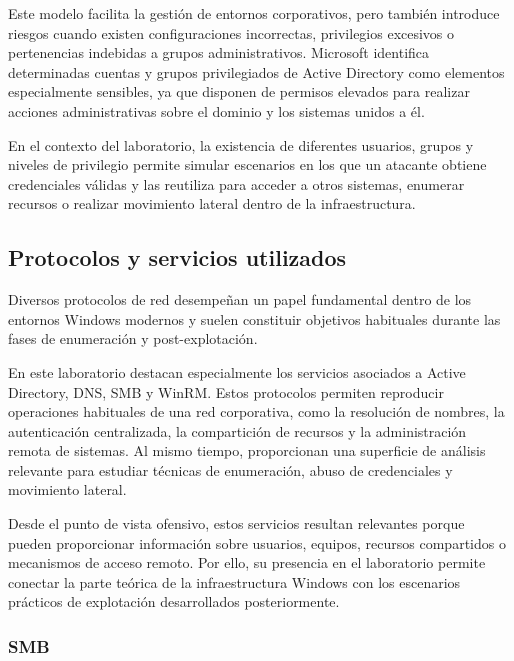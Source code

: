 Este modelo facilita la gestión de entornos corporativos, pero también introduce riesgos cuando existen configuraciones incorrectas, privilegios excesivos o pertenencias indebidas a grupos administrativos. Microsoft identifica determinadas cuentas y grupos privilegiados de Active Directory como elementos especialmente sensibles, ya que disponen de permisos elevados para realizar acciones administrativas sobre el dominio y los sistemas unidos a él.

En el contexto del laboratorio, la existencia de diferentes usuarios, grupos y niveles de privilegio permite simular escenarios en los que un atacante obtiene credenciales válidas y las reutiliza para acceder a otros sistemas, enumerar recursos o realizar movimiento lateral dentro de la infraestructura.

\subsection{Protocolos y servicios utilizados}

Diversos protocolos de red desempeñan un papel fundamental dentro de los entornos Windows modernos y suelen constituir objetivos habituales durante las fases de enumeración y post-explotación.

En este laboratorio destacan especialmente los servicios asociados a Active Directory, DNS, SMB y WinRM. Estos protocolos permiten reproducir operaciones habituales de una red corporativa, como la resolución de nombres, la autenticación centralizada, la compartición de recursos y la administración remota de sistemas. Al mismo tiempo, proporcionan una superficie de análisis relevante para estudiar técnicas de enumeración, abuso de credenciales y movimiento lateral.

Desde el punto de vista ofensivo, estos servicios resultan relevantes porque pueden proporcionar información sobre usuarios, equipos, recursos compartidos o mecanismos de acceso remoto. Por ello, su presencia en el laboratorio permite conectar la parte teórica de la infraestructura Windows con los escenarios prácticos de explotación desarrollados posteriormente.


\subsubsection{SMB}

